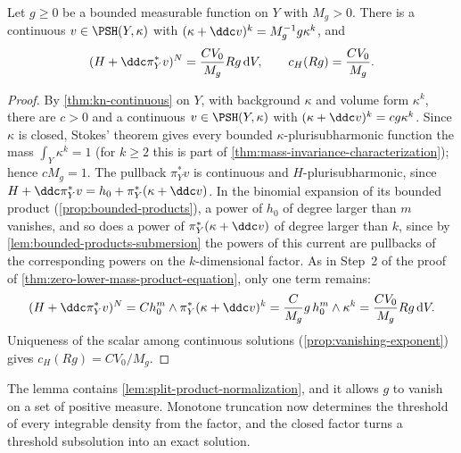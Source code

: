 \begin{lemma}\label{lem:closed-factor-bounded-normalization}
Let $g\geq0$ be a bounded measurable function on $Y$ with $M_g>0$. There is a continuous $v\in\PSH(Y,\kappa)$ with $(\kappa+\ddc v)^k=M_g^{-1}g\kappa^k$, and
\[
 (H+\ddc\pi_Y^*v)^N=\frac{CV_0}{M_g}Rg\,\mathrm{d}V,
 \qquad
 c_H(Rg)=\frac{CV_0}{M_g}.
\]
\end{lemma}
\begin{proof}
By \cref{thm:kn-continuous} on $Y$, with background $\kappa$ and volume form $\kappa^k$, there are $c>0$ and a continuous $v\in\PSH(Y,\kappa)$ with $(\kappa+\ddc v)^k=cg\kappa^k$. Since $\kappa$ is closed, Stokes' theorem gives every bounded $\kappa$-plurisubharmonic function the mass $\int_Y\kappa^k=1$ (for $k\geq2$ this is part of \cref{thm:mass-invariance-characterization}); hence $cM_g=1$. The pullback $\pi_Y^*v$ is continuous and $H$-plurisubharmonic, since $H+\ddc\pi_Y^*v=h_0+\pi_Y^*(\kappa+\ddc v)$. In the binomial expansion of its bounded product (\cref{prop:bounded-products}), a power of $h_0$ of degree larger than $m$ vanishes, and so does a power of $\pi_Y^*(\kappa+\ddc v)$ of degree larger than $k$, since by \cref{lem:bounded-products-submersion} the powers of this current are pullbacks of the corresponding powers on the $k$-dimensional factor. As in Step~2 of the proof of \cref{thm:zero-lower-mass-product-equation}, only one term remains:
\[
 (H+\ddc\pi_Y^*v)^N=Ch_0^m\wedge\pi_Y^*(\kappa+\ddc v)^k
 =\frac{C}{M_g}g\,h_0^m\wedge\kappa^k=\frac{CV_0}{M_g}Rg\,\mathrm{d}V.
\]
Uniqueness of the scalar among continuous solutions (\cref{prop:vanishing-exponent}) gives $c_H(Rg)=CV_0/M_g$.
\end{proof}

The lemma contains \cref{lem:split-product-normalization}, and it allows $g$ to vanish on a set of positive measure. Monotone truncation now determines the threshold of every integrable density from the factor, and the closed factor turns a threshold subsolution into an exact solution.

